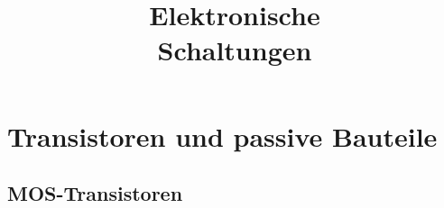 \documentclass[european]{latex4ei_sheet}
\title{Elektronische \\ Schaltungen}
\begin{document}
\ifdefined\GitRevision{}\fi

\maketitle

\section{Transistoren und passive Bauteile}
\subsection{MOS-Transistoren}

\begin{sectionbox}

\end{sectionbox}
\end{document}
